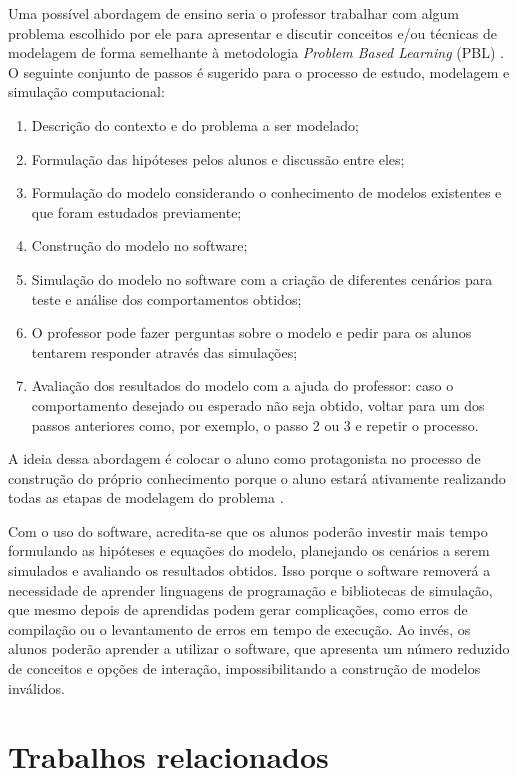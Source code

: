 \documentclass[
	12pt,				%
	openright,			%
	oneside,			%
	a4paper,			%
	main=brazil,
	english,			%
	]{ufsj-abntex2}
\begin{document}
Uma possível abordagem de ensino seria o professor trabalhar com algum problema escolhido por ele para apresentar e discutir conceitos e/ou técnicas de modelagem de forma semelhante à metodologia \textit{Problem Based Learning} (PBL) \cite{Akcay2009}. O seguinte conjunto de passos é sugerido para o processo de estudo, modelagem e simulação computacional: 

\begin{enumerate}
 \item Descrição do contexto e do problema a ser modelado;
 \item Formulação das hipóteses pelos alunos e discussão entre eles;
 \item Formulação do modelo considerando o conhecimento de modelos existentes e que foram estudados previamente;
 \item Construção do modelo no software;
 \item Simulação do modelo no software com a criação de diferentes cenários para teste e análise dos comportamentos obtidos;
 \item O professor pode fazer perguntas sobre o modelo e pedir para os alunos tentarem responder através das simulações; 
 \item Avaliação dos resultados do modelo com a ajuda do professor: caso o comportamento desejado ou esperado não seja obtido, voltar para um dos passos anteriores como, por exemplo, o passo 2 ou 3 e repetir o processo. 
\end{enumerate}

A ideia dessa abordagem é colocar o aluno como protagonista no processo de construção do próprio conhecimento porque o aluno estará ativamente realizando todas as etapas de modelagem do problema \cite{Akcay2009, Eleonora2022}. 

Com o uso do software, acredita-se que os alunos poderão investir mais tempo formulando as hipóteses e equações do modelo, planejando os cenários a serem simulados e avaliando os resultados obtidos. Isso porque o software removerá a necessidade de aprender linguagens de programação e bibliotecas de simulação, que mesmo depois de aprendidas podem gerar complicações, como erros de compilação ou o levantamento de erros em tempo de execução. Ao invés, os alunos poderão aprender a utilizar o software, que apresenta um número reduzido de conceitos e opções de interação, impossibilitando a construção de modelos inválidos.

\chapter{Trabalhos relacionados}
\label{chap:relacionados}
\end{document}
